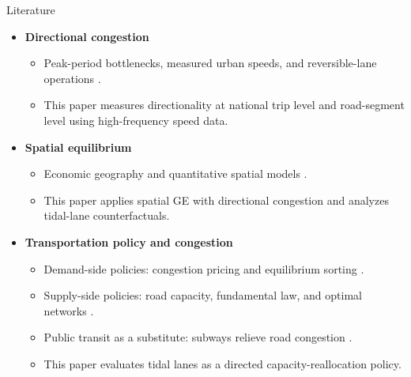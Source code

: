 \documentclass[11pt,aspectratio=169]{beamer}
\newcommand{\good}[1]{\textcolor{blue!70!black}{#1}}
\begin{document}
\begin{frame}{Literature}
\begin{itemize}\small
  \item \textbf{Directional congestion}
  \begin{itemize}\footnotesize
    \item Peak-period bottlenecks, measured urban speeds, and reversible-lane operations \citep{vickrey1969,arnott1993,couture2018,akbar2023,wolshon2006}.
    \item \good{This paper measures directionality at national trip level and road-segment level using high-frequency speed data.}
  \end{itemize}
  \item \textbf{Spatial equilibrium}
  \begin{itemize}\footnotesize
    \item Economic geography and quantitative spatial models \citep{krugman1991,eaton2002,allen2014,ahlfeldt2015}.
    \item \good{This paper applies spatial GE with directional congestion and analyzes tidal-lane counterfactuals.}
  \end{itemize}
  \item \textbf{Transportation policy and congestion}
  \begin{itemize}\footnotesize
    \item Demand-side policies: congestion pricing and equilibrium sorting \citep{vickrey1969,kreindler2024,barwick2024,yang2020}.
    \item Supply-side policies: road capacity, fundamental law, and optimal networks \citep{duranton2011,fajgelbaum2020}.
    \item Public transit as a substitute: subways relieve road congestion \citep{gu2021}.
    \item \good{This paper evaluates tidal lanes as a directed capacity-reallocation policy.}
  \end{itemize}
\end{itemize}
\end{frame}

\end{document}
